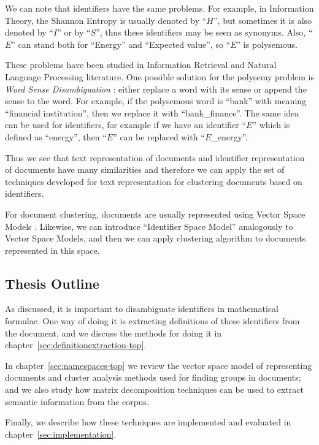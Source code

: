 We can note that identifiers have the same problems. For example,
in Information Theory, the Shannon Entropy is usually denoted by
``$H$'', but sometimes it is also denoted by ``$I$'' or by ``$S$'',
thus these identifiers may be seen as synonyms.
Also, ``$E$'' can stand both for ``Energy'' and ``Expected value'',
so ``$E$'' is polysemous.

These problems have been studied in Information Retrieval and
Natural Language Processing literature.
One possible solution for the polysemy problem is \emph{Word Sense Disambiguation}
\cite{jurafsky2000speech}: either replace a word with its sense
\cite{stokoe2003word} or append the sense to the word. For example,
if the polysemous word is ``bank'' with meaning ``financial institution'',
then we replace it with ``bank\_finance''. The same idea can be used
for identifiers, for example if we have an identifier ``$E$'' which is
defined as ``energy'', then ``$E$'' can be replaced with ``$E$\_energy''.

Thus we see that text representation of documents and identifier representation
of documents have many similarities and therefore we can apply the set of
techniques developed for text representation for clustering documents based
on identifiers.

For document clustering, documents are usually represented using
Vector Space Models \cite{oikonomakou2005review} \cite{aggarwal2012survey}.
Likewise, we can introduce ``Identifier Space Model'' analogously to
Vector Space Models, and then we can apply clustering algorithm 
to documents represented in this space. 


\subsection{Thesis Outline}

As discussed, it is important to disambiguate identifiers in mathematical 
formulae. One way of doing it is extracting definitions of these identifiers 
from the document, and we discuss the methods for doing it in chapter~\ref{sec:definitionextraction-top}.

In chapter~\ref{sec:namespaces-top} we review the vector space model of 
representing documents and cluster analysis methods used for finding 
groups in documents; and we also study how matrix decomposition 
techniques  can be used to extract semantic information from the corpus. 

Finally, we describe how these techniques are implemented and evaluated in 
chapter~\ref{sec:implementation}.

